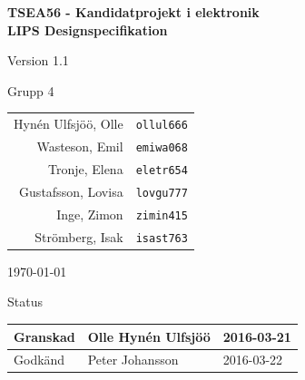 \documentclass[11pt]{article}
\begin{document}
\begin{titlepage}
\begin{center}

{\Large\bfseries TSEA56 - Kandidatprojekt i elektronik \\ LIPS Designspecifikation}

\vspace{5em}

Version 1.1

\vspace{5em}
Grupp 4 \\
\begin{tabular}{rl}
Hynén Ulfsjöö, Olle&\verb+ollul666+
\\
Wasteson, Emil&\verb+emiwa068+
\\
Tronje, Elena&\verb+eletr654+
\\
Gustafsson, Lovisa&\verb+lovgu777+
\\
Inge, Zimon&\verb+zimin415+
\\
Strömberg, Isak&\verb+isast763+
\\
\end{tabular}

\vspace{5em}
\today

\vspace{16em}
Status
\begin{longtable}{|l|l|l|} \hline

Granskad & Olle Hynén Ulfsjöö & 2016-03-21 \\ \hline
Godkänd & Peter Johansson & 2016-03-22 \\ \hline
 
\end{longtable}

\end{center}
\end{titlepage}
\end{document}

